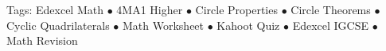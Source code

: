 \documentclass[11pt,a4paper]{article}
\begin{document}
\vspace{14pt}
\begin{center}
  \sffamily\scriptsize\textcolor{textmuted}{
    Tags: Edexcel Math $\bullet$ 4MA1 Higher $\bullet$ Circle Properties $\bullet$ Circle Theorems $\bullet$ Cyclic Quadrilaterals $\bullet$ Math Worksheet $\bullet$ Kahoot Quiz $\bullet$ Edexcel IGCSE $\bullet$ Math Revision
  }
\end{center}
\end{document}
